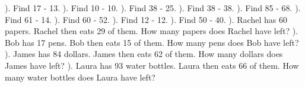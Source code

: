 \documentclass{article}%
\begin{document}
\newline%
). Find 17 {-} 13.%
\newline%
\newline%
). Find 10 {-} 10.%
\newline%
\newline%
). Find 38 {-} 25.%
\newline%
\newline%
). Find 38 {-} 38.%
\newline%
\newline%
). Find 85 {-} 68.%
\newline%
\newline%
). Find 61 {-} 14.%
\newline%
\newline%
). Find 60 {-} 52.%
\newline%
\newline%
). Find 12 {-} 12.%
\newline%
\newline%
). Find 50 {-} 40.%
\newline%
\newline%
). Rachel has 60 papers. Rachel then eats 29 of them. How many papers does Rachel have left?%
\newline%
\newline%
). Bob has 17 pens. Bob then eats 15 of them. How many pens does Bob have left?%
\newline%
\newline%
). James has 84 dollars. James then eats 62 of them. How many dollars does James have left?%
\newline%
\newline%
). Laura has 93 water bottles. Laura then eats 66 of them. How many water bottles does Laura have left?%
\newline%
\newline%
\newline%
\end{document}
